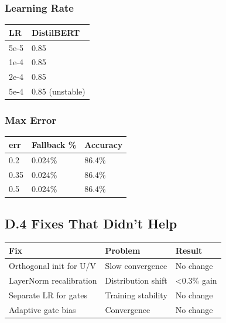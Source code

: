 \subsubsection{Learning Rate}

\begin{table}[H]
\centering
\small
\begin{tabular}{ll}
\toprule
\textbf{LR} & \textbf{DistilBERT} \\
\midrule
5e-5 & 0.85 \\
1e-4 & 0.85 \\
2e-4 & 0.85 \\
5e-4 & 0.85 (unstable) \\
\bottomrule
\end{tabular}
\end{table}

\subsubsection{Max Error}

\begin{table}[H]
\centering
\small
\begin{tabular}{lll}
\toprule
\textbf{err} & \textbf{Fallback \%} & \textbf{Accuracy} \\
\midrule
0.2 & 0.024\% & 86.4\% \\
0.35 & 0.024\% & 86.4\% \\
0.5 & 0.024\% & 86.4\% \\
\bottomrule
\end{tabular}
\end{table}

\subsection{D.4 Fixes That Didn't Help}

\begin{table}[H]
\centering
\small
\begin{tabular}{lll}
\toprule
\textbf{Fix} & \textbf{Problem} & \textbf{Result} \\
\midrule
Orthogonal init for U/V & Slow convergence & No change \\
LayerNorm recalibration & Distribution shift & <0.3\% gain \\
Separate LR for gates & Training stability & No change \\
Adaptive gate bias & Convergence & No change \\
\bottomrule
\end{tabular}
\end{table}

